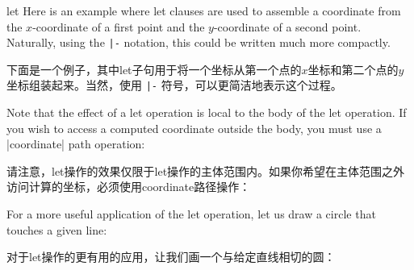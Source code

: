 \begin{pathoperation}{let}{
        }
    Here is an example where let clauses are used to assemble a coordinate from
    the $x$-coordinate of a first point and the $y$-coordinate of a second
    point. Naturally, using the \verb!|-! notation, this could be written much
    more compactly.

    下面是一个例子，其中let子句用于将一个坐标从第一个点的$x$坐标和第二个点的$y$坐标组装起来。当然，使用 \verb!|-! 符号，可以更简洁地表示这个过程。

\begin{codeexample}[preamble={\usetikzlibrary{calc}}]
\end{codeexample}

    Note that the effect of a let operation is local to the body of the let
    operation. If you wish to access a computed coordinate outside the body,
    you must use a |coordinate| path operation:
    
    
    请注意，let操作的效果仅限于let操作的主体范围内。如果你希望在主体范围之外访问计算的坐标，必须使用coordinate路径操作：

\begin{codeexample}[preamble={\usetikzlibrary{calc}}]
\end{codeexample}

    For a more useful application of the let operation, let us draw a circle
    that touches a given line:
    
    对于let操作的更有用的应用，让我们画一个与给定直线相切的圆：


\begin{codeexample}[pre={\pgfmathsetseed{1}},preamble={\usetikzlibrary{calc}}]
\end{codeexample}
\end{pathoperation}
